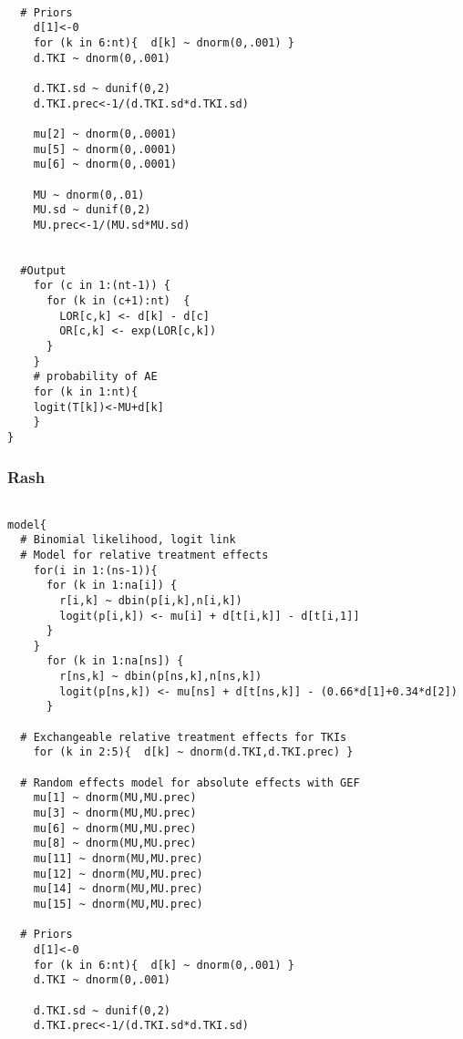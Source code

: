 \documentclass[11pt,final,fleqn]{article}\usepackage[]{graphicx}\usepackage[]{color}
\theoremstyle{plain}
\begin{document}
\begin{appendices}
\begin{verbatim}
       
  # Priors
    d[1]<-0                                      
    for (k in 6:nt){  d[k] ~ dnorm(0,.001) }     
    d.TKI ~ dnorm(0,.001)
    
    d.TKI.sd ~ dunif(0,2) 
    d.TKI.prec<-1/(d.TKI.sd*d.TKI.sd)
    
    mu[2] ~ dnorm(0,.0001)                     
    mu[5] ~ dnorm(0,.0001)                       
    mu[6] ~ dnorm(0,.0001)                       
      
    MU ~ dnorm(0,.01)                         
    MU.sd ~ dunif(0,2) 
    MU.prec<-1/(MU.sd*MU.sd)
    
      
  #Output                                       
    for (c in 1:(nt-1)) {                        
      for (k in (c+1):nt)  { 
        LOR[c,k] <- d[k] - d[c]
        OR[c,k] <- exp(LOR[c,k])
      }  
    }
    # probability of AE
    for (k in 1:nt){ 
    logit(T[k])<-MU+d[k]
    }
}

\end{verbatim}

\subsubsection{Rash} 
\begin{verbatim} 

model{
  # Binomial likelihood, logit link
  # Model for relative treatment effects
    for(i in 1:(ns-1)){                  
      for (k in 1:na[i]) {               
        r[i,k] ~ dbin(p[i,k],n[i,k])     
        logit(p[i,k]) <- mu[i] + d[t[i,k]] - d[t[i,1]]  
      }
    }   
      for (k in 1:na[ns]) {               
        r[ns,k] ~ dbin(p[ns,k],n[ns,k])     
        logit(p[ns,k]) <- mu[ns] + d[t[ns,k]] - (0.66*d[1]+0.34*d[2])  
      }
  
  # Exchangeable relative treatment effects for TKIs
    for (k in 2:5){  d[k] ~ dnorm(d.TKI,d.TKI.prec) }
  
  # Random effects model for absolute effects with GEF
    mu[1] ~ dnorm(MU,MU.prec)
    mu[3] ~ dnorm(MU,MU.prec)
    mu[6] ~ dnorm(MU,MU.prec) 
    mu[8] ~ dnorm(MU,MU.prec) 
    mu[11] ~ dnorm(MU,MU.prec) 
    mu[12] ~ dnorm(MU,MU.prec) 
    mu[14] ~ dnorm(MU,MU.prec)
    mu[15] ~ dnorm(MU,MU.prec)
       
  # Priors
    d[1]<-0                                      
    for (k in 6:nt){  d[k] ~ dnorm(0,.001) }     
    d.TKI ~ dnorm(0,.001)
    
    d.TKI.sd ~ dunif(0,2) 
    d.TKI.prec<-1/(d.TKI.sd*d.TKI.sd)
    

\end{verbatim}
\end{appendices}
\end{document}
